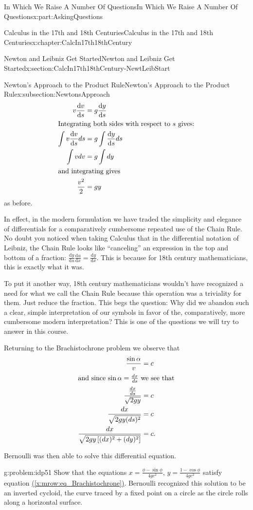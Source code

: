 \documentclass[oneside,10pt,]{book}
\newcommand{\xreffont}{\relax}
\numberwithin{equation}{section}
\newcommand{\dfdx}[2]{\frac{\text{d}{#1}}{\text{d}{#2}}}
\newcommand{\amp}{&}
\begin{document}
\begin{partptx}{In Which We Raise A Number Of Questions}{}{In Which We Raise A Number Of Questions}{}{}{x:part:AskingQuestions}
\begin{chapterptx}{Calculus in the 17th and 18th Centuries}{}{Calculus in the 17th and 18th Centuries}{}{}{x:chapter:CalcIn17th18thCentury}
\begin{sectionptx}{Newton and Leibniz Get Started}{}{Newton and Leibniz Get Started}{}{}{x:section:CalcIn17th18thCentury-NewtLeibStart}
\begin{subsectionptx}{Newton's Approach to the Product Rule}{}{Newton's Approach to the Product Rule}{}{}{x:subsection:NewtonsApproach}
\begin{align*}
v\dfdx{v}{s} \amp = g\dfdx{y}{s}\\
\intertext{Integrating both sides with respect to \(s\) gives:}
\int{}v\dfdx{v}{s}d s \amp = g\int{}\dfdx{y}{s}d s\\
\int{}vd v \amp = g\int{}d y\\
\intertext{and integrating gives}
\frac{v^2}{2} \amp = gy
\end{align*}
as before.%
\par
In effect, in the modern formulation we have traded the simplicity and elegance of differentials for a comparatively cumbersome repeated use of the Chain Rule. No doubt you noticed when taking Calculus that in the differential notation of Leibniz, the Chain Rule looks like ``canceling'' an expression in the top and bottom of a fraction: \(\dfdx{y}{u}\dfdx{u}{x} = \dfdx{y}{x}\). This is because for 18th century mathematicians, this is exactly what it was.%
\par
To put it another way, 18th century mathematicians wouldn't have recognized a need for what we call the Chain Rule because this operation was a triviality for them. Just reduce the fraction. This begs the question: Why did we abandon such a clear, simple interpretation of our symbols in favor of the, comparatively, more cumbersome modern interpretation? This is one of the questions we will try to answer in this course.%
\par
Returning to the Brachistochrone problem we observe that%
\begin{align}
\frac{\sin\alpha}{v} \amp = c\notag\\
\intertext{and since \(\sin\alpha = \frac{d x}{d s}\)   we see that}
\frac{\frac{d x}{d s}}{\sqrt{2gy}} \amp = c\notag\\
\frac{d x}{\sqrt{2gy(ds)^2}} \amp = c\notag\\
\frac{d x}{\sqrt{2gy\left[(d x)^2+(d y)^2\right]}} \amp = c\text{.}\label{x:mrow:eq_Brachistochrone}
\end{align}
%
\par
Bernoulli was then able to solve this differential equation.%
\begin{problem}{}{g:problem:idp51}%
 Show that the equations \(x=\frac{\phi-\sin \phi}{4gc^2},\,y=\frac{1-\cos \phi}{4gc^2}\) satisfy equation \hyperref[x:mrow:eq_Brachistochrone]{({\xreffont\ref{x:mrow:eq_Brachistochrone}})}. Bernoulli recognized this solution to be an inverted cycloid, the curve traced by a fixed point on a circle as the circle rolls along a horizontal surface.%

\end{problem}
\end{subsectionptx}
\end{sectionptx}
\end{chapterptx}
\end{partptx}
\end{document}
